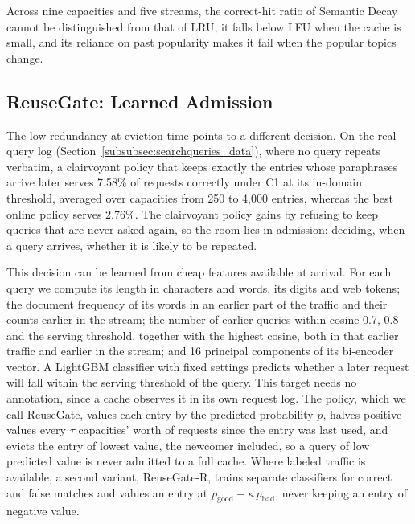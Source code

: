 \documentclass[authoryear,preprint,review,12pt]{elsarticle}
\begin{document}
Across nine capacities and five streams, the correct-hit ratio of Semantic Decay cannot be distinguished from that of LRU, it falls below LFU when the cache is small, and its reliance on past popularity makes it fail when the popular topics change.

\subsection{ReuseGate: Learned Admission}
\label{subsubsec:learned_admission}
The low redundancy at eviction time points to a different decision. On the real query log (Section~\ref{subsubsec:searchqueries_data}), where no query repeats verbatim, a clairvoyant policy that keeps exactly the entries whose paraphrases arrive later serves 7.58\% of requests correctly under C1 at its in-domain threshold, averaged over capacities from 250 to 4,000 entries, whereas the best online policy serves 2.76\%. The clairvoyant policy gains by refusing to keep queries that are never asked again, so the room lies in admission: deciding, when a query arrives, whether it is likely to be repeated.

This decision can be learned from cheap features available at arrival. For each query we compute its length in characters and words, its digits and web tokens; the document frequency of its words in an earlier part of the traffic and their counts earlier in the stream; the number of earlier queries within cosine 0.7, 0.8 and the serving threshold, together with the highest cosine, both in that earlier traffic and earlier in the stream; and 16 principal components of its bi-encoder vector. A LightGBM classifier with fixed settings predicts whether a later request will fall within the serving threshold of the query. This target needs no annotation, since a cache observes it in its own request log. The policy, which we call ReuseGate, values each entry by the predicted probability $p$, halves positive values every $\tau$ capacities' worth of requests since the entry was last used, and evicts the entry of lowest value, the newcomer included, so a query of low predicted value is never admitted to a full cache. Where labeled traffic is available, a second variant, ReuseGate-R, trains separate classifiers for correct and false matches and values an entry at $p_{\mathrm{good}}-\kappa\,p_{\mathrm{bad}}$, never keeping an entry of negative value.
\end{document}
